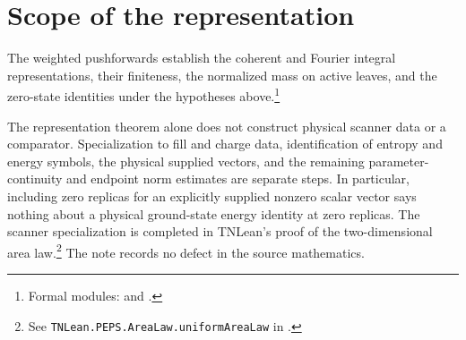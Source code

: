 \documentclass[11pt]{article}
\begin{document}
\section{Scope of the representation}

The weighted pushforwards establish the coherent and Fourier integral
representations, their finiteness, the normalized mass on active leaves, and
the zero-state identities under the hypotheses above.\footnote{Formal modules:
 and
.}

The representation theorem alone does not construct
physical scanner data or a comparator. Specialization to fill and charge data,
identification of entropy and energy symbols, the physical supplied vectors,
and the remaining parameter-continuity and endpoint norm estimates are separate
steps. In particular, including zero replicas for an explicitly supplied nonzero
scalar vector says nothing about a physical ground-state energy identity at zero
replicas. The scanner specialization is completed in TNLean's proof
of the two-dimensional area law.\footnote{See
\texttt{TNLean.PEPS.AreaLaw.uniformAreaLaw} in
\href{https://github.com/LionSR/TNLean/blob/442d18ba754ece8b979097f534316fc0ca52e661/TNLean/PEPS/AreaLaw/AreaLawTheorem.lean\#L45-L47}{}.}
The note records no defect in the source mathematics.



\end{document}
